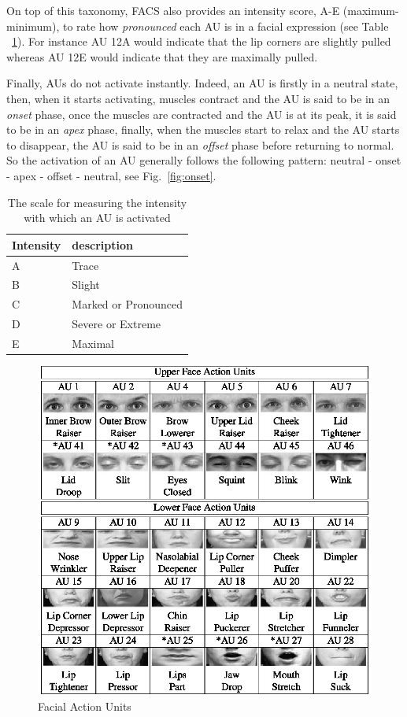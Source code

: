 \documentclass[12pt,twoside]{article}
\begin{document}
On top of this taxonomy, FACS also provides an intensity score, A-E
(maximum-minimum), to rate how \textit{pronounced} each AU is in a facial expression (see Table ~\ref{tab:scale-au}). For instance AU 12A would indicate that the lip corners are slightly pulled whereas AU 12E would indicate that they are maximally pulled.

Finally, AUs do not activate instantly. Indeed, an AU is firstly in a neutral
state, then, when it starts activating, muscles contract and the AU is said to
be in an \textit{onset} phase, once the muscles are contracted and the AU is at
its peak, it is said to be in an \textit{apex} phase, finally, when the muscles
start to relax and the AU starts to disappear, the AU is said to be in an
\textit{offset} phase before returning to normal. So the activation of an AU
generally follows the following pattern: neutral - onset - apex - offset -
neutral, see Fig.~\ref{fig:onset}.

\begin{table}[ht]
\centering
\begin{tabular}{|l|l|}
 \hline
 Intensity & description\\
 \hline
 \hline
 A & Trace                \\
 \hline
 B & Slight               \\
 \hline
 C & Marked or Pronounced \\
 \hline
 D & Severe or Extreme    \\
 \hline
 E & Maximal              \\
 \hline
\end{tabular}
\caption{The scale for measuring the intensity with which an AU is activated}
\label{tab:scale-au}
\end{table}

\begin{figure}
\centering
\includegraphics[scale=1]{./figures/faus.eps}
\caption{Facial Action Units}
\label{fig:fau}
\end{figure}
\end{document}
